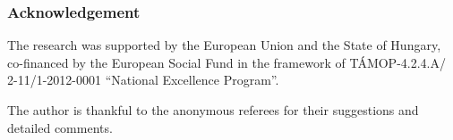 \documentclass[submission,copyright,creativecommons]{eptcs}
\theoremstyle{plain}
\theoremstyle{definition}
\theoremstyle{remark}
\begin{document}
\subsubsection*{Acknowledgement}
The research was supported by the European Union and the State of Hungary,
co-financed by the European Social Fund in the framework of T\'AMOP-4.2.4.A/ 2-11/1-2012-0001 ``National Excellence Program''.

The author is thankful to the anonymous referees for their suggestions and detailed comments.



\end{document}
